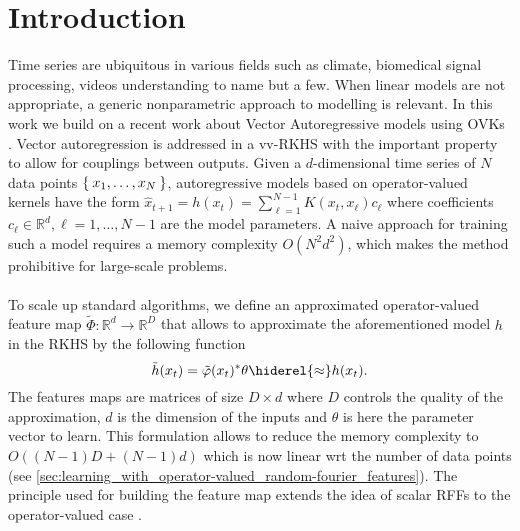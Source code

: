 

\section{Introduction}
Time series are ubiquitous in various fields such as climate, biomedical signal
processing, videos understanding to name but a few. When linear models are not
appropriate, a generic nonparametric approach to modelling is relevant. In this
work we build on a recent work about Vector Autoregressive models using
\aclp{OVK} \cite{Lim2013,Lim2015}. Vector autoregression is
addressed in a \acl{vv-RKHS} with the important property to allow for couplings
between outputs. Given a $d$-dimensional time series of $N$ data points
$\Set{x_1,\dots, x_N}$, autoregressive models based on operator-valued kernels
have the form $\hat{x}_{t+1}=h(x_t)=\sum_{\ell=1}^{N-1}K(x_t,x_\ell){c}_\ell$
where coefficients ${c}_\ell\in\mathbb{R}^d, \ell=1,\dots,N-1$ are the model
parameters. A naive approach for training such a model requires a memory
complexity $O(N^2d^2)$, which makes the method prohibitive for large-scale
problems.
\paragraph{}
To scale up standard algorithms, we define an approximated operator-valued
feature map $\tilde{\Phi}:\mathbb{R}^d\to\mathbb{R}^D$ that allows to
approximate the aforementioned model $h$ in the \ac{RKHS} by the following
function
\begin{dmath*}
    \tilde{h}(x_t) = \tilde{\Phi}(x_t)^*\theta \hiderel{\approx} h(x_t).
\end{dmath*}
The features maps are matrices of size $D\times  d$ where $D$ controls the
quality of the approximation, $d$ is the dimension of the inputs and $\theta$
is here the parameter vector to learn. This formulation allows to reduce the
memory complexity to $O((N-1)D + (N-1)d)$ which is now linear \acs{wrt} the
number of data points
(see \cref{sec:learning_with_operator-valued_random-fourier_features}). The
principle used for building the feature map extends the idea of scalar
\aclp{RFF} to the operator-valued case \citep{Rahimi2007,sutherland2015}.

